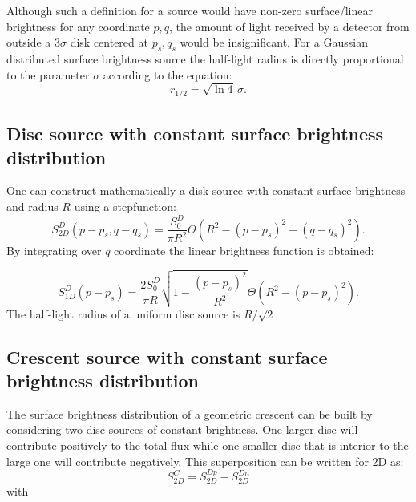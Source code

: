 \documentclass[usenatbib]{mn2e}
\begin{document}
Although such a definition for a source would have non-zero surface/linear brightness for any coordinate $p,q$, the amount of light received by a detector from outside a $3 \sigma$ disk centered at $p_s, q_s$ 
would be insignificant. For a Gaussian distributed surface brightness source the half-light radius is directly proportional to the parameter $\sigma$ according to the equation:
\begin{equation}
r_{1/2} = \sqrt{\ln4}\,\sigma.
\end{equation}

\subsection{Disc source with constant surface brightness distribution}

One can construct mathematically a disk source with constant surface brightness and radius $R$ using a stepfunction:
\begin{equation}
 S_{2D}^D(p-p_s, q-q_s) = \frac{S_0^D}{\pi R^2} \Theta \left( R^2 - \left( p-p_s \right)^2 - \left( q-q_s \right)^2 \right).
\end{equation}
By integrating over $q$ coordinate the linear brightness function is obtained:


\begin{equation}
 S_{1D}^D(p-p_s) = \frac{2 S_0^D}{\pi R}  \sqrt{1 - \frac{(p-p_s)^2}{R^2} }    \Theta \left( R^2 - \left( p-p_s \right)^2 \right).
\end{equation}
The half-light radius of a uniform disc source is $R/\sqrt{2}$.

\subsection{Crescent source with constant surface brightness distribution}\label{subsec:crescent}

The surface brightness distribution of a geometric crescent can be built 
by considering two disc sources of constant brightness. One larger disc 
will contribute positively to the total flux while one smaller disc 
that is interior to the large one will contribute negatively. This superposition can be written for 2D as:\\

\begin{equation}
 S_{2D}^C =  S_{2D}^{Dp} -  S_{2D}^{Dn}  
 \label{eqn:s2d}
\end{equation}
with\\
\end{document}
